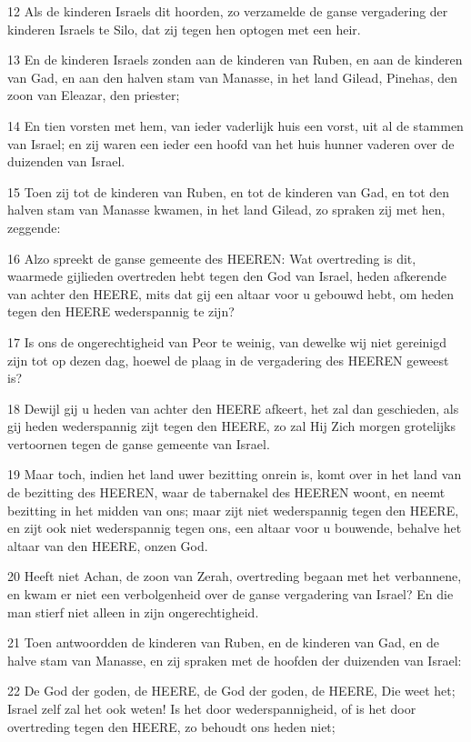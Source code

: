\par 12 Als de kinderen Israels dit hoorden, zo verzamelde de ganse vergadering der kinderen Israels te Silo, dat zij tegen hen optogen met een heir.
\par 13 En de kinderen Israels zonden aan de kinderen van Ruben, en aan de kinderen van Gad, en aan den halven stam van Manasse, in het land Gilead, Pinehas, den zoon van Eleazar, den priester;
\par 14 En tien vorsten met hem, van ieder vaderlijk huis een vorst, uit al de stammen van Israel; en zij waren een ieder een hoofd van het huis hunner vaderen over de duizenden van Israel.
\par 15 Toen zij tot de kinderen van Ruben, en tot de kinderen van Gad, en tot den halven stam van Manasse kwamen, in het land Gilead, zo spraken zij met hen, zeggende:
\par 16 Alzo spreekt de ganse gemeente des HEEREN: Wat overtreding is dit, waarmede gijlieden overtreden hebt tegen den God van Israel, heden afkerende van achter den HEERE, mits dat gij een altaar voor u gebouwd hebt, om heden tegen den HEERE wederspannig te zijn?
\par 17 Is ons de ongerechtigheid van Peor te weinig, van dewelke wij niet gereinigd zijn tot op dezen dag, hoewel de plaag in de vergadering des HEEREN geweest is?
\par 18 Dewijl gij u heden van achter den HEERE afkeert, het zal dan geschieden, als gij heden wederspannig zijt tegen den HEERE, zo zal Hij Zich morgen grotelijks vertoornen tegen de ganse gemeente van Israel.
\par 19 Maar toch, indien het land uwer bezitting onrein is, komt over in het land van de bezitting des HEEREN, waar de tabernakel des HEEREN woont, en neemt bezitting in het midden van ons; maar zijt niet wederspannig tegen den HEERE, en zijt ook niet wederspannig tegen ons, een altaar voor u bouwende, behalve het altaar van den HEERE, onzen God.
\par 20 Heeft niet Achan, de zoon van Zerah, overtreding begaan met het verbannene, en kwam er niet een verbolgenheid over de ganse vergadering van Israel? En die man stierf niet alleen in zijn ongerechtigheid.
\par 21 Toen antwoordden de kinderen van Ruben, en de kinderen van Gad, en de halve stam van Manasse, en zij spraken met de hoofden der duizenden van Israel:
\par 22 De God der goden, de HEERE, de God der goden, de HEERE, Die weet het; Israel zelf zal het ook weten! Is het door wederspannigheid, of is het door overtreding tegen den HEERE, zo behoudt ons heden niet;
